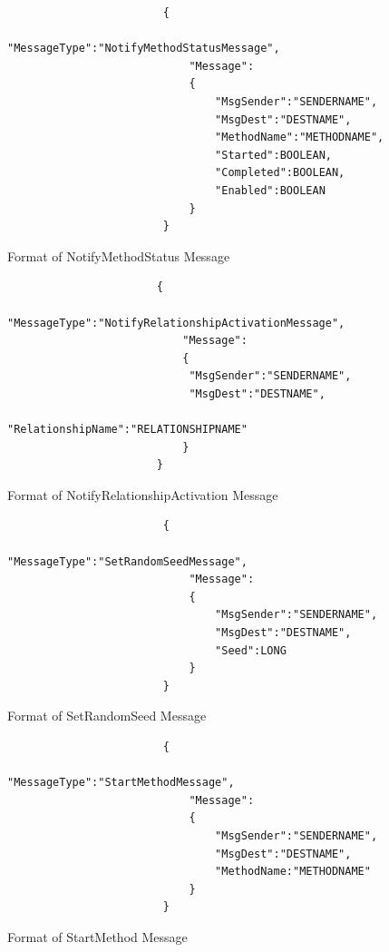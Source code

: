 \begin{enumerate}
\begin{figure}[H]
\centering
\begin{verbatim}
                        {
	                        "MessageType":"NotifyMethodStatusMessage",
 	                        "Message":
 	                        {
 	                        	"MsgSender":"SENDERNAME",
 	                        	"MsgDest":"DESTNAME",
 	                        	"MethodName":"METHODNAME",
 	                        	"Started":BOOLEAN,
 	                        	"Completed":BOOLEAN,
 	                        	"Enabled":BOOLEAN
 	                        }
                        }
\end{verbatim}
\caption{Format of NotifyMethodStatus Message}
\label{fig:NotifyMethodStatus}
\end{figure}

\begin{figure}[H]
\centering
\begin{verbatim}
                       {
	                       "MessageType":"NotifyRelationshipActivationMessage",
 	                       "Message":
 	                       {
 	                       	"MsgSender":"SENDERNAME",
 	                       	"MsgDest":"DESTNAME",
 	                       	"RelationshipName":"RELATIONSHIPNAME"
 	                       }
                       }
\end{verbatim}
\caption{Format of NotifyRelationshipActivation Message}
\label{fig:NotifyRelationshipActivation}
\end{figure}

\begin{figure}[H]
\centering
\begin{verbatim}
                        {
	                        "MessageType":"SetRandomSeedMessage",
 	                        "Message":
 	                        {
 	                        	"MsgSender":"SENDERNAME",
 	                        	"MsgDest":"DESTNAME",
 	                        	"Seed":LONG
 	                        }
                        }
\end{verbatim}
\caption{Format of SetRandomSeed Message}
\label{fig:SetRandomSeed}
\end{figure}

\begin{figure}[H]
\centering
\begin{verbatim}
                        {
                        	"MessageType":"StartMethodMessage",
                         	"Message":
                         	{
 	                        	"MsgSender":"SENDERNAME",
 	                        	"MsgDest":"DESTNAME",
 	                        	"MethodName:"METHODNAME"
 	                        }
                        }
\end{verbatim}
\caption{Format of StartMethod Message}
\label{fig:StartMethod}
\end{figure}


\end{enumerate}
